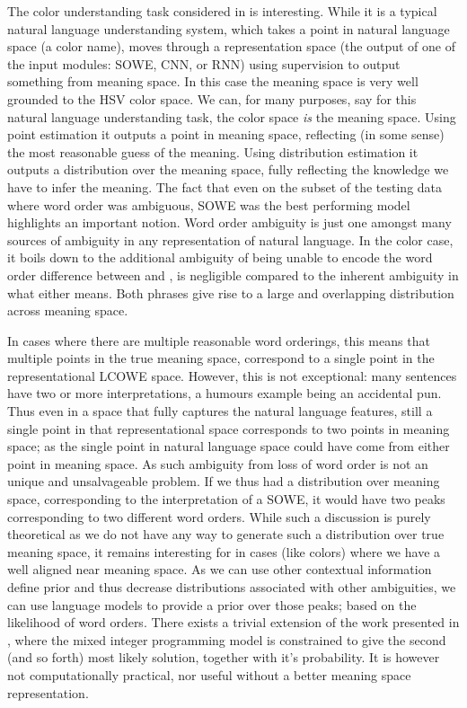 \documentclass{book}
\begin{document}
The color understanding task considered in  is interesting.
While it is a typical natural language understanding system,
which takes a point in natural language space (a color name),
moves through a representation space (the output of one of the input modules: SOWE, CNN, or RNN) using supervision to output something from meaning space.
In this case the meaning space is very well grounded to the HSV color space.
We can, for many purposes, say for this natural language understanding task, the color space \emph{is} the meaning space.
Using point estimation it outputs a point in meaning space, reflecting (in some sense) the most reasonable guess of the meaning.
Using distribution estimation it outputs a distribution over the meaning space, fully reflecting the knowledge we have to infer the meaning.
The fact that even on the subset of the testing data where word order was ambiguous, SOWE was the best performing model highlights an important notion.
Word order ambiguity is just one amongst many sources of ambiguity in any representation of natural language.
In the color case, it boils down to the additional ambiguity of being unable to encode the word order difference between  and , is negligible compared to the inherent ambiguity in what either means.
Both phrases give rise to a large and overlapping distribution across meaning space.

In cases where there are multiple reasonable word orderings,
this means that multiple points in the true meaning space, correspond to a single point in the representational LCOWE space.
However, this is not exceptional: 
many sentences have two or more interpretations, a humours example being an accidental pun.
Thus even in a space that fully captures the natural language features, still a single point in that representational space
corresponds to two points in meaning space;
as the single point in natural language space could have come from either point in meaning space.
As such ambiguity from loss of word order is not an unique and unsalvageable problem.
If we thus had a distribution over meaning space, corresponding to the interpretation of a SOWE, it would have two peaks corresponding to two different word orders.
While such a discussion is purely theoretical as we do not have any way to generate such a distribution over true meaning space,
it remains interesting for in cases (like colors) where we have a well aligned near meaning space.
As we can use other contextual information define prior and thus decrease distributions associated with other ambiguities,
we can use language models to provide a prior over those peaks; based on the likelihood of word orders.
There exists a trivial extension of the work presented in , where the mixed integer programming model is constrained to give the second (and so forth) most likely solution, together with it's probability.
It is however not computationally practical, nor useful without a better meaning space representation.
\end{document}
